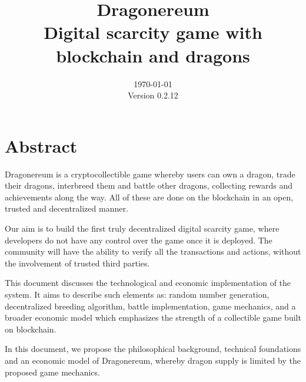 \documentclass[12pt]{article}
\title{ \vspace{8cm}
        Dragonereum \\
		\normalsize Digital scarcity game with blockchain and dragons}
\date{\vspace{10.5cm}
        \today \\	
		\small Version 0.2.12}
\begin{document}
\sloppy %

\maketitle
\setlength{\parskip}{9.96pt}
 \par


\vspace{\baselineskip}

\vspace{\baselineskip}

\vspace{\baselineskip}
 \par

 \par

 \par



\section*{Abstract}
Dragonereum is a cryptocollectible game whereby users can own a dragon, trade their dragons, interbreed them and battle other dragons, collecting rewards and achievements along the way. All of these are done on the blockchain in an open, trusted and decentralized manner.\par

Our aim is to build the first truly decentralized digital scarcity game, where developers do not have any control over the game once it is deployed. The community will have the ability to verify all the transactions and actions, without the involvement of trusted third parties.\par

This document discusses the technological and economic implementation of the system. It aims to describe such elements as: random number generation, decentralized breeding algorithm, battle implementation, game mechanics, and a broader economic model which emphasizes the strength of a collectible game built on blockchain.\par

In this document, we propose the philosophical background, technical foundations and an economic model of Dragonereum, whereby dragon supply is limited by the proposed game mechanics.%

\end{document}
